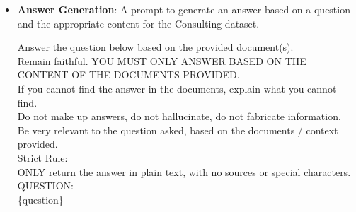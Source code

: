 \documentclass[12pt,twoside]{report}
\begin{document}
\begin{itemize}
\begin{colquote}
    Examples: \\
    - "How should the client position themselves against emerging fintech competitors based on BCG's latest market analysis?" \\
    - "What strategic priorities should a mid-sized industrials firm pursue to remain competitive in a decarbonizing economy, according to McKinsey's 2023 insights?" \\

    The documents information: \\
    \{topics_and_summaries\}
    \end{colquote}

    \item \textbf{Answer Generation}: A prompt to generate an answer based on a question and the appropriate content for the Consulting dataset.
    \begin{colquote}
    Answer the question below based on the provided document(s). \\
    Remain faithful. YOU MUST ONLY ANSWER BASED ON THE CONTENT OF THE DOCUMENTS PROVIDED. \\
    If you cannot find the answer in the documents, explain what you cannot find. \\
    Do not make up answers, do not hallucinate, do not fabricate information. \\
    Be very relevant to the question asked, based on the documents / context provided. \\

    Strict Rule: \\
    ONLY return the answer in plain text, with no sources or special characters. \\

    QUESTION: \\
    \{question\}
    \end{colquote}


\end{itemize}
\end{document}
